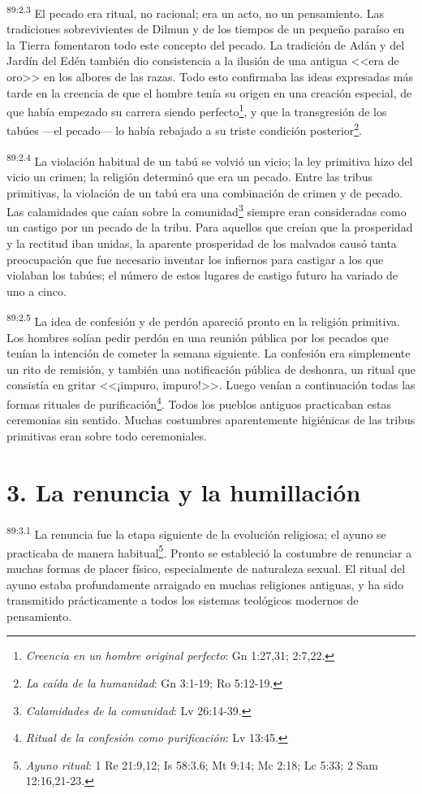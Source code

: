 \par
\textsuperscript{89:2.3} El pecado era ritual, no racional; era un acto, no un pensamiento. Las tradiciones sobrevivientes de Dilmun y de los tiempos de un pequeño paraíso en la Tierra fomentaron todo este concepto del pecado. La tradición de Adán y del Jardín del Edén también dio consistencia a la ilusión de una antigua <<era de oro>> en los albores de las razas. Todo esto confirmaba las ideas expresadas más tarde en la creencia de que el hombre tenía su origen en una creación especial, de que había empezado su carrera siendo perfecto\footnote{\textit{Creencia en un hombre original perfecto}: Gn 1:27,31; 2:7,22.}, y que la transgresión de los tabúes ---el pecado--- lo había rebajado a su triste condición posterior\footnote{\textit{La caída de la humanidad}: Gn 3:1-19; Ro 5:12-19.}.

\par
\textsuperscript{89:2.4} La violación habitual de un tabú se volvió un vicio; la ley primitiva hizo del vicio un crimen; la religión determinó que era un pecado. Entre las tribus primitivas, la violación de un tabú era una combinación de crimen y de pecado. Las calamidades que caían sobre la comunidad\footnote{\textit{Calamidades de la comunidad}: Lv 26:14-39.} siempre eran consideradas como un castigo por un pecado de la tribu. Para aquellos que creían que la prosperidad y la rectitud iban unidas, la aparente prosperidad de los malvados causó tanta preocupación que fue necesario inventar los infiernos para castigar a los que violaban los tabúes; el número de estos lugares de castigo futuro ha variado de uno a cinco.

\par
\textsuperscript{89:2.5} La idea de confesión y de perdón apareció pronto en la religión primitiva. Los hombres solían pedir perdón en una reunión pública por los pecados que tenían la intención de cometer la semana siguiente. La confesión era simplemente un rito de remisión, y también una notificación pública de deshonra, un ritual que consistía en gritar <<¡impuro, impuro!>>. Luego venían a continuación todas las formas rituales de purificación\footnote{\textit{Ritual de la confesión como purificación}: Lv 13:45.}. Todos los pueblos antiguos practicaban estas ceremonias sin sentido. Muchas costumbres aparentemente higiénicas de las tribus primitivas eran sobre todo ceremoniales.

\section*{3. La renuncia y la humillación}
\par
\textsuperscript{89:3.1} La renuncia fue la etapa siguiente de la evolución religiosa; el ayuno se practicaba de manera habitual\footnote{\textit{Ayuno ritual}: 1 Re 21:9,12; Is 58:3.6; Mt 9:14; Mc 2:18; Lc 5:33; 2 Sam 12:16,21-23.}. Pronto se estableció la costumbre de renunciar a muchas formas de placer físico, especialmente de naturaleza sexual. El ritual del ayuno estaba profundamente arraigado en muchas religiones antiguas, y ha sido transmitido prácticamente a todos los sistemas teológicos modernos de pensamiento.

